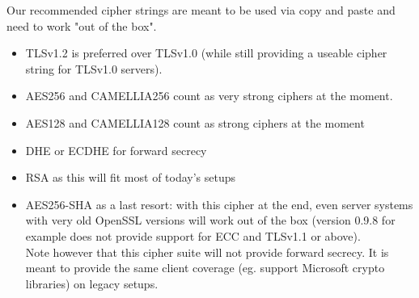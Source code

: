 Our recommended cipher strings are meant to be used via copy and paste and need to work
"out of the box".

\begin{itemize}
\item TLSv1.2 is preferred over TLSv1.0 (while still providing a useable cipher
      string for TLSv1.0 servers).
\item AES256 and CAMELLIA256 count as very strong ciphers at the moment.
\item AES128 and CAMELLIA128 count as strong ciphers at the moment
\item DHE or ECDHE for forward secrecy
\item RSA as this will fit most of today's setups
\item AES256-SHA as a last resort: with this cipher at the end, even server
      systems with very old OpenSSL versions will work out of the box (version 0.9.8 for example does not
      provide support for ECC and TLSv1.1 or above). \\
      Note however that this cipher suite will not provide forward secrecy. It
      is meant to provide the same client coverage (eg. support Microsoft crypto
      libraries) on legacy setups.
\end{itemize}
